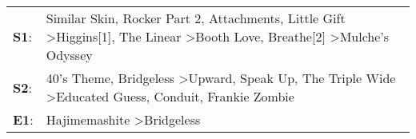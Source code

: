 \begin{supertabular}{p{0.03\textwidth}p{0.92\textwidth}}
 \textbf{S1}:  &  Similar Skin\textsuperscript{}, \enspace Rocker Part 2\textsuperscript{}, \enspace Attachments\textsuperscript{}, \enspace Little Gift\textsuperscript{} \textgreater \enspace Higgins[1]\textsuperscript{}, \enspace The Linear\textsuperscript{} \textgreater \enspace Booth Love\textsuperscript{}, \enspace Breathe[2]\textsuperscript{} \textgreater \enspace Mulche's Odyssey\textsuperscript{}  \enspace  \\
 \textbf{S2}:  &                                                              40's Theme\textsuperscript{}, \enspace Bridgeless\textsuperscript{} \textgreater \enspace Upward\textsuperscript{}, \enspace Speak Up\textsuperscript{}, \enspace The Triple Wide\textsuperscript{} \textgreater \enspace Educated Guess\textsuperscript{}, \enspace Conduit\textsuperscript{}, \enspace Frankie Zombie\textsuperscript{}  \enspace  \\
 \textbf{E1}:  &                                                                                                                                                                                                                                                                                                                     Hajimemashite\textsuperscript{} \textgreater \enspace Bridgeless\textsuperscript{}  \enspace  \\
\end{supertabular}
